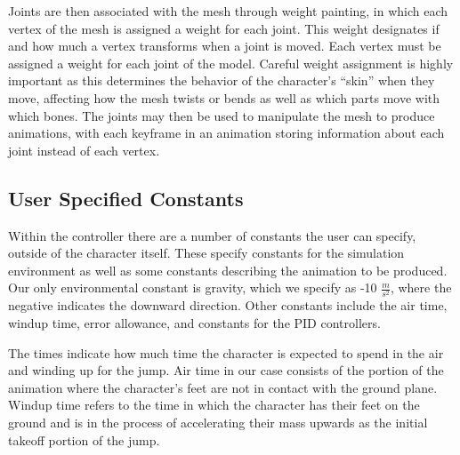 Joints are then associated with the mesh through weight painting, in which each vertex of the mesh is assigned a weight for each joint.  This weight designates if and how much a vertex transforms when a joint is moved.  Each vertex must be assigned a weight for each joint of the model.  Careful weight assignment is highly important as this determines the behavior of the character's ``skin'' when they move, affecting how the mesh twists or bends as well as which parts move with which bones.  The joints may then be used to manipulate the mesh to produce animations, with each keyframe in an animation storing information about each joint instead of each vertex.

\subsection{User Specified Constants}
\label{subsection:user_constants}
Within the controller there are a number of constants the user can specify, outside of the character itself.  These specify constants for the simulation environment as well as some constants describing the animation to be produced.  Our only environmental constant is gravity, which we specify as -10 $\frac{m}{s^2}$, where the negative indicates the downward direction.  Other constants include the air time, windup time, error allowance, and constants for the PID controllers.

The times indicate how much time the character is expected to spend in the air and winding up for the jump.  Air time in our case consists of the portion of the animation where the character's feet are not in contact with the ground plane.  Windup time refers to the time in which the character has their feet on the ground and is in the process of accelerating their mass upwards as the initial takeoff portion of the jump.

